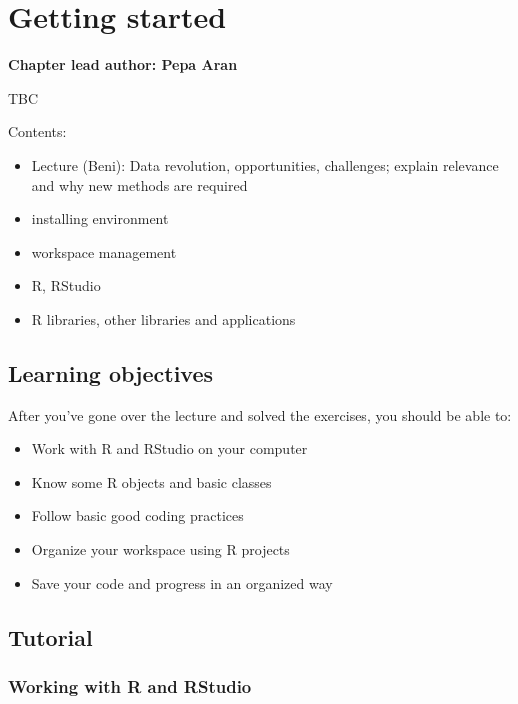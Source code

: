 \documentclass[
]{book}
\providecommand{\tightlist}{%
  \setlength{\itemsep}{0pt}\setlength{\parskip}{0pt}}
\begin{document}
\hypertarget{getting_started}{%
\chapter{Getting started}\label{getting_started}}

\textbf{Chapter lead author: Pepa Aran}

TBC

Contents:

\begin{itemize}
\tightlist
\item
  Lecture (Beni): Data revolution, opportunities, challenges; explain relevance and why new methods are required
\item
  installing environment
\item
  workspace management
\item
  R, RStudio
\item
  R libraries, other libraries and applications
\end{itemize}

\hypertarget{learning-objectives}{%
\section{Learning objectives}\label{learning-objectives}}

After you've gone over the lecture and solved the exercises, you should be able to:

\begin{itemize}
\tightlist
\item
  Work with R and RStudio on your computer
\item
  Know some R objects and basic classes
\item
  Follow basic good coding practices
\item
  Organize your workspace using R projects
\item
  Save your code and progress in an organized way
\end{itemize}

\hypertarget{tutorial}{%
\section{Tutorial}\label{tutorial}}

\hypertarget{working-with-r-and-rstudio}{%
\subsection{Working with R and RStudio}\label{working-with-r-and-rstudio}}
\end{document}
